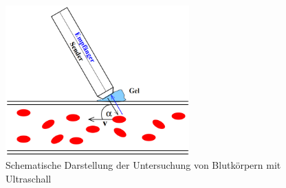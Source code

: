 \begin{figure}
  \centering
  \includegraphics[width=200pt]{data/dopplerskizze.png}
  \caption{Schematische Darstellung der Untersuchung von Blutkörpern mit Ultraschall\,\cite{Versuchsanleitung}}
  \label{fig:theorieskizze}
\end{figure}
